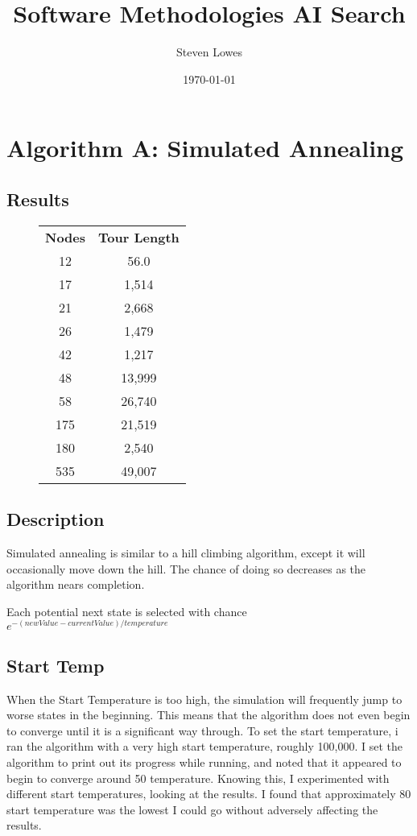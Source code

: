 \documentclass[a4paper, 11pt,table]{article}
\author{Steven Lowes}
\title{Software Methodologies AI Search}
\date{\today{}}
\begin{document}
	
	\section{Algorithm A: Simulated Annealing}
	
	\subsection{Results}
	\begin{figure}
		\label{useCase:annealResults}
		\begin{center}
			\begin{tabu}{|c c|}
				\textbf{Nodes} & \textbf{Tour Length} \\
				12 & 56.0 \\
				17 & 1,514 \\
				21 & 2,668 \\
				26 & 1,479 \\
				42 & 1,217 \\
				48 & 13,999 \\
				58 & 26,740 \\
				175 & 21,519 \\
				180 & 2,540 \\
				535 & 49,007 \\
			\end{tabu}
		\end{center}
	\end{figure}
	
	\subsection{Description}
	Simulated annealing is similar to a hill climbing algorithm, except it will occasionally move down the hill. The chance of doing so decreases as the algorithm nears completion.
	
	Each potential next state is selected with chance $e^{-(newValue - currentValue) / temperature}$
	
	\subsection{Start Temp}
	When the Start Temperature is too high, the simulation will frequently jump to worse states in the beginning. This means that the algorithm does not even begin to converge until it is a significant way through. To set the start temperature, i ran the algorithm with a very high start temperature, roughly 100,000. I set the algorithm to print out its progress while running, and noted that it appeared to begin to converge around 50 temperature. Knowing this, I experimented with different start temperatures, looking at the results. I found that approximately 80 start temperature was the lowest I could go without adversely affecting the results.	
		
\end{document}

